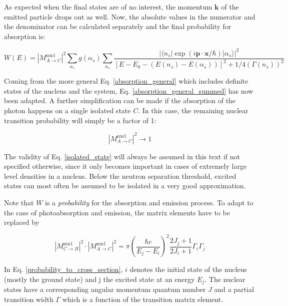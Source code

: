 \documentclass{article}
\begin{document}
As expected when the final states are of no interest, the momentum $\mathbf{k}$ of the emitted particle drops out as well. 
Now, the absolute values in the numerator and the denominator can be calculated separately and the final probability for absorption is:

\begin{equation}
\label{absorption_general_summed}
	W(E) = \left| M^{\mathrm{nucl}}_{A \to C} \right|^2 \sum_{\alpha_s} g(\alpha_s) \sum_{n_s} \frac{ \left| \langle n_s | \exp{\left( i \mathbf{p} \cdot \mathbf{x} / \hbar \right)} | \alpha_s \rangle \right|^2  }{\left[ E - E_0 - \left( E(n_s) - E(\alpha_s) \right) \right]^2 + 1/4 \left( \Gamma(n_s) \right)^2 }
\end{equation}

Coming from the more general Eq. \ref{absorption_general} which includes definite states of the nucleus and the system, Eq. \ref{absorption_general_summed} has now been adapted.
A further simplification can be made if the absorption of the photon happens on a single isolated state $C$.
In this case, the remaining nuclear transition probability will simply be a factor of 1:

\begin{equation}
	\label{isolated_state}
\left| M^{\mathrm{nucl}}_{A \to C} \right|^2 \to 1
\end{equation}

The validity of Eq. \ref{isolated_state} will always be assumed in this text if not specified otherwise, since it only becomes important in cases of extremely large level densities in a nucleus. Below the neutron separation threshold, excited states can most often be assumed to be isolated in a very good approximation.

Note that $W$ is a \textit{probability} for the absorption and emission process. To adapt to the case of photoabsorption and emission, the matrix elements have to be replaced by \cite{Bet37}

\begin{equation}
	\label{probability_to_cross_section}
	\left| M^{\mathrm{nucl}}_{C \to B} \right|^2 \cdot \left| M^{\mathrm{nucl}}_{A \to C} \right|^2 = \pi \left( \frac{\hbar c}{E_j - E_i} \right)^2 \frac{2 J_j + 1}{2 J_i + 1} \Gamma_i \Gamma_j
\end{equation}

In Eq. \ref{probability_to_cross_section}, $i$ denotes the initial state of the nucleus (mostly the ground state) and j the excited state at an energy $E_j$. The nuclear states have a corresponding angular momentum quantum number $J$ and a partial transition width $\Gamma$ which is a function of the transition matrix element.
\end{document}
